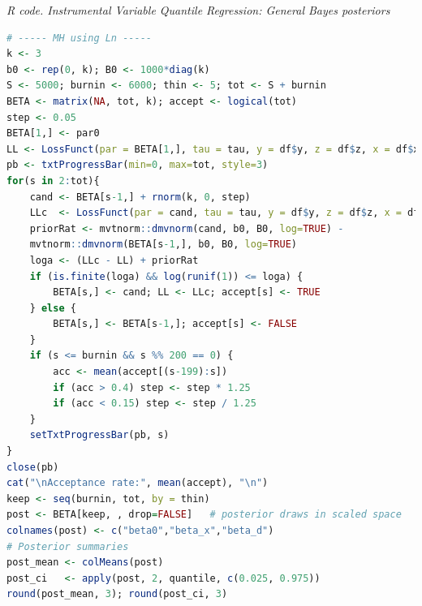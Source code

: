 \begin{enumerate}[leftmargin=*]
\begin{tcolorbox}[enhanced,width=4.67in,center upper,
	fontupper=\large\bfseries,drop shadow southwest,sharp corners]
	\textit{R code. Instrumental Variable Quantile Regression: General Bayes posteriors}
	\begin{VF}
		\begin{lstlisting}[language=R]
# ----- MH using Ln -----
k <- 3
b0 <- rep(0, k); B0 <- 1000*diag(k)
S <- 5000; burnin <- 6000; thin <- 5; tot <- S + burnin
BETA <- matrix(NA, tot, k); accept <- logical(tot)
step <- 0.05
BETA[1,] <- par0
LL <- LossFunct(par = BETA[1,], tau = tau, y = df$y, z = df$z, x = df$x, d = df$d)
pb <- txtProgressBar(min=0, max=tot, style=3)
for(s in 2:tot){
	cand <- BETA[s-1,] + rnorm(k, 0, step)
	LLc  <- LossFunct(par = cand, tau = tau, y = df$y, z = df$z, x = df$x, d = df$d)
	priorRat <- mvtnorm::dmvnorm(cand, b0, B0, log=TRUE) -
	mvtnorm::dmvnorm(BETA[s-1,], b0, B0, log=TRUE)
	loga <- (LLc - LL) + priorRat
	if (is.finite(loga) && log(runif(1)) <= loga) {
		BETA[s,] <- cand; LL <- LLc; accept[s] <- TRUE
	} else {
		BETA[s,] <- BETA[s-1,]; accept[s] <- FALSE
	}
	if (s <= burnin && s %% 200 == 0) {          
		acc <- mean(accept[(s-199):s])
		if (acc > 0.4) step <- step * 1.25
		if (acc < 0.15) step <- step / 1.25
	}
	setTxtProgressBar(pb, s)
}
close(pb)
cat("\nAcceptance rate:", mean(accept), "\n")
keep <- seq(burnin, tot, by = thin)
post <- BETA[keep, , drop=FALSE]   # posterior draws in scaled space
colnames(post) <- c("beta0","beta_x","beta_d")
# Posterior summaries
post_mean <- colMeans(post)
post_ci   <- apply(post, 2, quantile, c(0.025, 0.975))
round(post_mean, 3); round(post_ci, 3)
\end{lstlisting}
	\end{VF}
\end{tcolorbox} 

\end{enumerate}